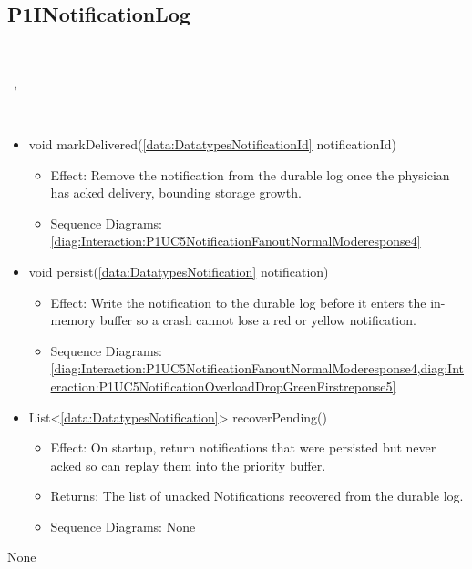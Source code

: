   \subsection{P1INotificationLog}\label{int:InterfacesP1INotificationLog}
    \begin{description}
      \item[Provided by:] \iconcomponent{}~
      \item[Required by:] \iconcomponent{}~, \iconcomponent{}~ 
      \item[Operations:] ~
    \begin{itemize}[noitemsep,nolistsep,leftmargin=-.25cm]
      \item \textsf{void markDelivered(\ref{data:DatatypesNotificationId} notificationId)}
        \begin{itemize}[noitemsep,nolistsep]
           \item Effect: Remove the notification from the durable log once the physician has acked delivery, bounding storage growth. 
           \item Sequence Diagrams: \cref{diag:Interaction:P1UC5NotificationFanoutNormalModeresponse4}
        \end{itemize}
      \item \textsf{void persist(\ref{data:DatatypesNotification} notification)}
        \begin{itemize}[noitemsep,nolistsep]
           \item Effect: Write the notification to the durable log before it enters the in-memory buffer so a crash cannot lose a red or yellow notification. 
           \item Sequence Diagrams: \cref{diag:Interaction:P1UC5NotificationFanoutNormalModeresponse4,diag:Interaction:P1UC5NotificationOverloadDropGreenFirstreponse5}
        \end{itemize}
      \item \textsf{List\textless{}\ref{data:DatatypesNotification}\textgreater{} recoverPending()}
        \begin{itemize}[noitemsep,nolistsep]
           \item Effect: On startup, return notifications that were persisted but never acked so  can replay them into the priority buffer. 
           \item Returns: The list of unacked Notifications recovered from the durable log.
           \item Sequence Diagrams: None
        \end{itemize}
    \end{itemize}
      \item[Diagrams:] None
    \end{description}

